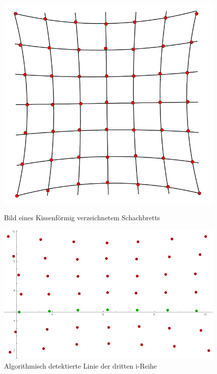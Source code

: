\begin{figure}[!htb]
	\includegraphics[width=\linewidth]{images/KissenVerzeichnung.png}
	\caption{Bild eines Kissenförmig verzeichnetem Schachbretts}
	\label{fig:Extreme5}
	\endminipage\hfill
	\includegraphics[width=\linewidth]{images/AlgKissen.png}
	\caption{Algorithmisch detektierte Linie der dritten i-Reihe}
	\label{fig:Extreme6}
	\endminipage\hfill
\end{figure}

